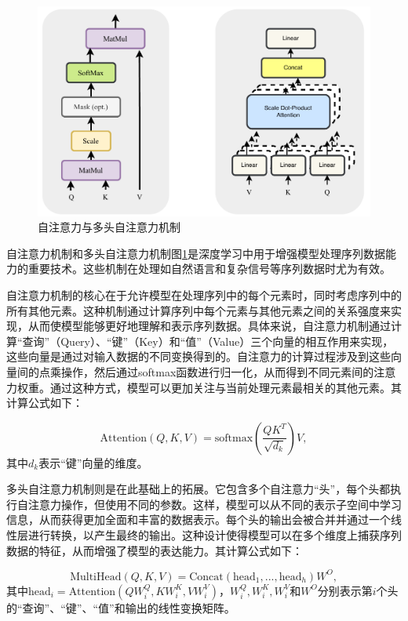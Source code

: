 \begin{figure}
    \centering
    \includegraphics[width=\textwidth]{Image/self-attention.pdf}
    \caption{自注意力与多头自注意力机制}
    \label{fig:self-attention}
\end{figure}

自注意力机制和多头自注意力机制图\ref{fig:self-attention}是深度学习中用于增强模型处理序列数据能力的重要技术。这些机制在处理如自然语言和复杂信号等序列数据时尤为有效。

自注意力机制的核心在于允许模型在处理序列中的每个元素时，同时考虑序列中的所有其他元素。这种机制通过计算序列中每个元素与其他元素之间的关系强度来实现，从而使模型能够更好地理解和表示序列数据。具体来说，自注意力机制通过计算“查询”（Query）、“键”（Key）和“值”（Value）三个向量的相互作用来实现，这些向量是通过对输入数据的不同变换得到的。自注意力的计算过程涉及到这些向量间的点乘操作，然后通过softmax函数进行归一化，从而得到不同元素间的注意力权重。通过这种方式，模型可以更加关注与当前处理元素最相关的其他元素。其计算公式如下：

\begin{equation}
    \text{Attention}(Q, K, V) = \text{softmax}(\frac{QK^T}{\sqrt{d_k}})V,
\end{equation}
其中$d_k$表示“键”向量的维度。

多头自注意力机制则是在此基础上的拓展。它包含多个自注意力“头”，每个头都执行自注意力操作，但使用不同的参数。这样，模型可以从不同的表示子空间中学习信息，从而获得更加全面和丰富的数据表示。每个头的输出会被合并并通过一个线性层进行转换，以产生最终的输出。这种设计使得模型可以在多个维度上捕获序列数据的特征，从而增强了模型的表达能力。其计算公式如下：

\begin{equation}
    \text{MultiHead}(Q, K, V) = \text{Concat}(\text{head}_1, ..., \text{head}_h)W^O,
\end{equation}
其中$\text{head}_i = \text{Attention}(QW_i^Q, KW_i^K, VW_i^V)$，$W_i^Q, W_i^K, W_i^V$和$W^O$分别表示第$i$个头的“查询”、“键”、“值”和输出的线性变换矩阵。

